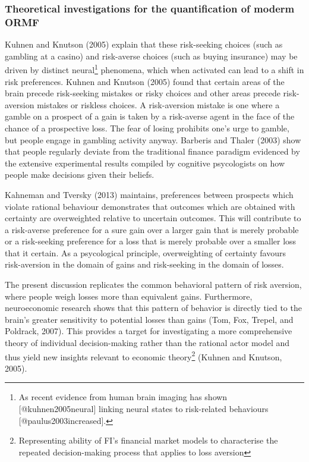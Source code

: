 \documentclass[]{DissertateUSU}
\let\rmarkdownfootnote\footnote%
\def\footnote{\protect\rmarkdownfootnote}
\begin{document}
\subsubsection{Theoretical investigations for the quantification of moderm ORMF}

Kuhnen and Knutson (2005) explain that these risk-seeking choices (such
as gambling at a casino) and risk-averse choices (such as buying
insurance) may be driven by distinct
neural\footnote{As recent evidence from human brain imaging has shown [@kuhnen2005neural] linking neural states to risk-related behaviours [@paulus2003increased].}
phenomena, which when activated can lead to a shift in risk preferences.
Kuhnen and Knutson (2005) found that certain areas of the brain precede
risk-seeking mistakes or risky choices and other areas precede
risk-aversion mistakes or riskless choices. A risk-aversion mistake is
one where a gamble on a prospect of a gain is taken by a risk-averse
agent in the face of the chance of a prospective loss. The fear of
losing prohibits one's urge to gamble, but people engage in gambling
activity anyway. Barberis and Thaler (2003) show that people regularly
deviate from the traditional finance paradigm evidenced by the extensive
experimental results compiled by cognitive psycologists on how people
make decisions given their beliefs.\medskip 

Kahneman and Tversky (2013) maintains, preferences between prospects
which violate rational behaviour demonstrates that outcomes which are
obtained with certainty are overweighted relative to uncertain outcomes.
This will contribute to a risk-averse preference for a sure gain over a
larger gain that is merely probable or a risk-seeking preference for a
loss that is merely probable over a smaller loss that it certain. As a
psycological principle, overweighting of certainty favours risk-aversion
in the domain of gains and risk-seeking in the domain of losses.

The present discussion replicates the common behavioral pattern of risk
aversion, where people weigh losses more than equivalent gains.
Furthermore, neuroeconomic research shows that this pattern of behavior
is directly tied to the brain's greater sensitivity to potential losses
than gains (Tom, Fox, Trepel, and Poldrack, 2007). This provides a
target for investigating a more comprehensive theory of individual
decision-making rather than the rational actor model and thus yield new
insights relevant to economic
theory\footnote{Representing ability of FI's financial market models to characterise the repeated decision-making process that applies to loss aversion}
(Kuhnen and Knutson, 2005).\medskip  
\end{document}
